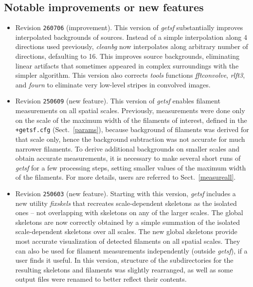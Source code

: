 \documentclass[a4paper,10pt]{article}
\begin{document}

\subsection{Notable improvements or new features}
\label{improvements}

\begin{itemize} 

\item Revision \verb!260706! (improvement). This version of \emph{getsf} substantially improves interpolated backgrounds of 
sources. Instead of a simple interpolation along 4 directions used previously, \emph{cleanbg} now interpolates along arbitrary 
number of directions, defaulting to 16. This improves source backgrounds, eliminating linear artifacts that sometimes appeared 
in complex surroundings with the simpler algorithm. This version also corrects \emph{tools} functions \emph{fftconvolve}, 
\emph{rlft3}, and \emph{fourn} to eliminate very low-level stripes in convolved images.

\item Revision \verb!250609! (new feature). This version of \textsl{getsf} enables filament measurements on all spatial scales.
Previously, measurements were done only on the scale of the maximum width of the filaments of interest, defined in the
\verb!+getsf.cfg! (Sect.~\ref{params}), because background of filaments was derived for that scale only, hence the background
subtraction was not accurate for much narrower filaments. To derive additional backgrounds on smaller scales and obtain accurate
measurements, it is necessary to make several short runs of \textsl{getsf} for a few processing steps, setting smaller values of
the maximum width of the filaments. For more details, users are referred to Sect.~\ref{measureall}.

\item Revision \verb!250603! (new feature). Starting with this version, \textsl{getsf} includes a new utility \textsl{fixskels}
that recreates scale-dependent skeletons as the isolated ones -- not overlapping with skeletons on any of the larger scales. The
global skeletons are now correctly obtained by a simple summation of the isolated scale-dependent skeletons over all scales. The
new global skeletons provide most accurate visualization of detected filaments on all spatial scales. They can also be used for
filament measurements independently (outside \textsl{getsf}), if a user finds it useful. In this version, structure of the
subdirectories for the resulting skeletons and filaments was slightly rearranged, as well as some output files were renamed to
better reflect their contents.


\end{itemize}
\end{document}
